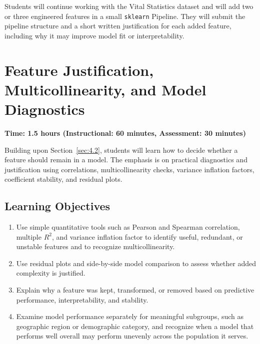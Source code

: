 Students will continue working with the Vital Statistics dataset and will add two or three engineered features in a small \verb|sklearn| Pipeline. They will submit the pipeline structure and a short written justification for each added feature, including why it may improve model fit or interpretability.

\section{Feature Justification, Multicollinearity, and Model Diagnostics}
\label{sec:4.3}

\textbf{Time: 1.5 hours (Instructional: 60 minutes, Assessment: 30 minutes)}

\noindent Building upon Section~\ref{sec:4.2}, students will learn how to decide whether a feature should remain in a model. The emphasis is on practical diagnostics and justification using correlations, multicollinearity checks, variance inflation factors, coefficient stability, and residual plots.

\subsection{Learning Objectives}

\begin{enumerate}
    \item Use simple quantitative tools such as Pearson and Spearman correlation, multiple $R^2$, and variance inflation factor to identify useful, redundant, or unstable features and to recognize multicollinearity.
    \item Use residual plots and side-by-side model comparison to assess whether added complexity is justified.
    \item Explain why a feature was kept, transformed, or removed based on predictive performance, interpretability, and stability.
    \item Examine model performance separately for meaningful
    subgroups, such as geographic region or demographic category, and
    recognize when a model that performs well overall may perform
    unevenly across the population it serves.
\end{enumerate}

